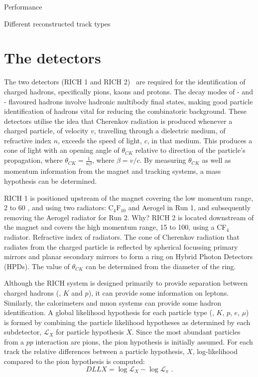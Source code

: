Performance~\cite{LHCb-DP-2013-002, LHCb-DP-2013-003}

Different reconstructed track types

\section{The \rich detectors}

The two \rich detectors (RICH 1 and RICH 2)~\cite{LHCb-DP-2012-003} are required for the identification of charged hadrons, specifically pions, kaons and protons. The decay modes of \bquark- and \cquark- flavoured hadrons involve hadronic multibody final states, making good particle identification of hadrons vital for reducing the combinatoric background. These detectors utilise the idea that Cherenkov radiation is produced whenever a charged particle, of velocity $v$, travelling through a dielectric medium, of refractive index $n$, exceeds the speed of light, $c$, in that medium. This produces a cone of light with an opening angle of $\theta_{CK}$ relative to direction of the particle's propagation, where $\theta_{CK} = \frac{1}{n\beta}$, where $\beta = v/c$. By measuring $\theta_{CK}$ as well as momentum information from the magnet and tracking systems, a mass hypothesis can be determined.

RICH 1 is positioned upstream of the magnet covering the low momentum range, 2 to 60 \gevc, and using two radiators: C$_4$F$_{10}$ and Aerogel in Run 1, and subsequently removing the Aerogel radiator for Run 2. Why? RICH 2 is located downstream of the magnet and covers the high momentum range, 15 to 100\gevc, using a CF$_4$ radiator. Refractive index of radiators. The cone of Cherenkov radiation that radiates from the charged particle is reflected by spherical focussing primary mirrors and planar secondary mirrors to form a ring on Hybrid Photon Detectors (HPDs). The value of $\theta_{CK}$ can be determined from the diameter of the ring. 

Although the RICH system is designed primarily to provide separation between charged hadrons (\pion, $K$ and $p$), it can provide some information on leptons. Similarly, the calorimeters and muon systems can provide some hadron identification. A global likelihood hypothesis for each particle type (\pion, $K$, $p$, $e$, $\mu$) is formed by combining the particle likelihood hypotheses as determined by each subdetector, $\mathcal{L}_X$ for particle hypothesis $X$. Since the most abundant particles from a $pp$ interaction are pions, the pion hypothesis is initially assumed. For each track the relative differences between a particle hypothesis, $X$, log-likelihood compared to the pion hypothesis is computed:
\begin{equation}
DLLX = \log{\mathcal{L}_X} - \log{\mathcal{L}_{\pi}} \text{ .}
\end{equation}

